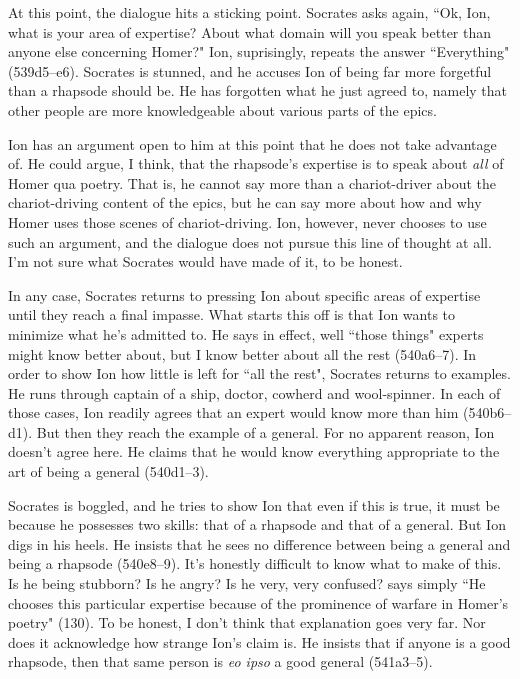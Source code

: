 \documentclass[11pt,letterpaper]{article}
\begin{document}
At this point, the dialogue hits a sticking point. Socrates asks again, ``Ok, Ion, what is your area of expertise? About what domain will you speak better than anyone else concerning Homer?" Ion, suprisingly, repeats the answer ``Everything" (539d5--e6). Socrates is stunned, and he accuses Ion of being far more forgetful than a rhapsode should be. He has forgotten what he just agreed to, namely that other people are more knowledgeable about various parts of the epics.

Ion has an argument open to him at this point that he does not take advantage of. He could argue, I think, that the rhapsode's expertise is to speak about \emph{all} of Homer qua poetry. That is, he cannot say more than a chariot-driver about the chariot-driving content of the epics, but he can say more about how and why Homer uses those scenes of chariot-driving. Ion, however, never chooses to use such an argument, and the dialogue does not pursue this line of thought at all. I'm not sure what Socrates would have made of it, to be honest.

In any case, Socrates returns to pressing Ion about specific areas of
expertise until they reach a final impasse. What starts this off is that
Ion wants to minimize what he's admitted to. He says in effect, well
``those things" experts might know better about, but I know better about
all the rest (540a6--7). In order to show Ion how little is left for ``all
the rest", Socrates returns to examples. He runs through captain of
a ship, doctor, cowherd and wool-spinner. In each of those cases, Ion
readily agrees that an expert would know more than him (540b6--d1). But
then they reach the example of a general. For no apparent reason, Ion
doesn't agree here. He claims that he would know everything appropriate to
the art of being a general (540d1--3).

Socrates is boggled, and he tries to show Ion that even if this is true, it must be because he possesses two skills: that of a rhapsode and that of a general. But Ion digs in his heels. He insists that he sees no difference between being a general and being a rhapsode (540e8--9). It's honestly difficult to know what to make of this. Is he being stubborn? Is he angry?  Is he very, very confused? \textcite{murray1996} says simply ``He chooses this particular expertise because of the prominence of warfare in Homer's poetry" (130). To be honest, I don't think that explanation goes very far. Nor does it acknowledge how strange Ion's claim is. He insists that if anyone is a good rhapsode, then that same person is \textit{eo ipso} a good general (541a3--5).
\end{document}
